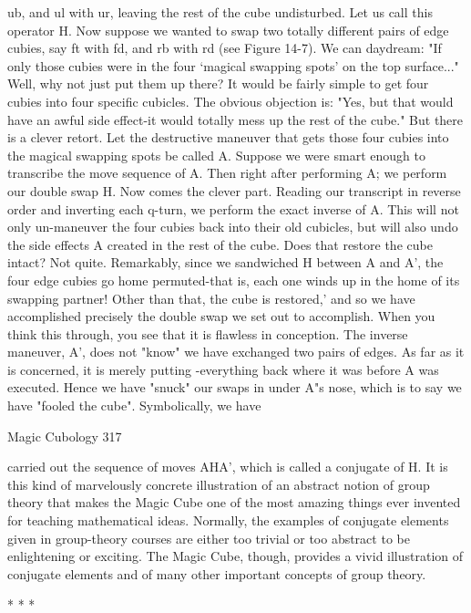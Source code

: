 ub, and ul with ur, leaving the rest of the cube undisturbed. Let us call this operator H.
Now suppose we wanted to swap two totally different pairs of edge cubies, say ft with
fd, and rb with rd (see Figure 14-7). We can daydream: "If only those cubies were in
the four `magical swapping spots' on the top surface..." Well, why not just put them
up there? It would be fairly simple to get four cubies into four specific cubicles. The
obvious objection is: "Yes, but that would have an awful side effect-it would totally
mess up the rest of the cube." But there is a clever retort. Let the destructive maneuver
that gets those four cubies into the magical swapping spots be called A. Suppose we
were smart enough to transcribe the move sequence of A. Then right after performing
A; we perform our double swap H. Now comes the clever part. Reading our transcript
in reverse order and inverting each q-turn, we perform the exact inverse of A. This
will not only un-maneuver the four cubies back into their old cubicles, but will also
undo the side effects A created in the rest of the cube. Does that restore the cube
intact? Not quite. Remarkably, since we sandwiched H between A and A', the four
edge cubies go home permuted-that is, each one winds up in the home of its swapping
partner! Other than that, the cube is restored,' and so we have accomplished precisely
the double swap we set out to accomplish.
        When you think this through, you see that it is flawless in conception. The
inverse maneuver, A', does not "know" we have exchanged two pairs of edges. As far
as it is concerned, it is merely putting -everything back where it was before A was
executed. Hence we have "snuck" our swaps in under A"s nose, which is to say we
have "fooled the cube". Symbolically, we have




Magic Cubology                                                                        317

carried out the sequence of moves AHA', which is called a conjugate of H.
        It is this kind of marvelously concrete illustration of an abstract notion of
group theory that makes the Magic Cube one of the most amazing things ever
invented for teaching mathematical ideas. Normally, the examples of conjugate
elements given in group-theory courses are either too trivial or too abstract to be
enlightening or exciting. The Magic Cube, though, provides a vivid illustration of
conjugate elements and of many other important concepts of group theory.

                                      *   *   *

